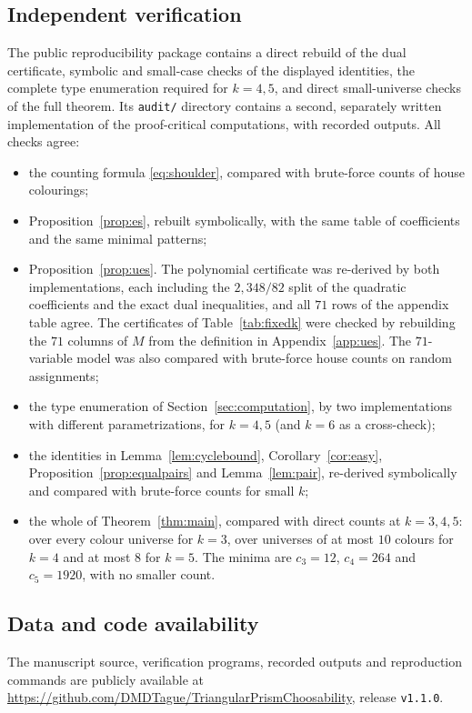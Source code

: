 \documentclass[11pt]{amsart}
\theoremstyle{definition}
\theoremstyle{remark}
\newcommand{\1}{\mathbf 1}
\begin{document}
\subsection{Independent verification}
The public reproducibility package contains a direct rebuild of the dual certificate, symbolic and
small-case checks of the displayed identities, the complete type enumeration required for $k=4,5$, and
direct small-universe checks of the full theorem. Its \texttt{audit/} directory contains a second,
separately written implementation of the proof-critical computations, with recorded outputs. All checks
agree:
\begin{itemize}
\item the counting formula \eqref{eq:shoulder}, compared with brute-force counts of house colourings;
\item Proposition~\ref{prop:es}, rebuilt symbolically, with the same table of coefficients and the same
  minimal patterns;
\item Proposition~\ref{prop:ues}. The polynomial certificate was re-derived by both implementations,
  each including the $2{,}348/82$ split of the quadratic coefficients and the exact dual inequalities,
  and all $71$ rows of the appendix table agree. The certificates of Table~\ref{tab:fixedk} were checked
  by rebuilding the $71$ columns of $M$ from the definition in Appendix~\ref{app:ues}. The
  $71$-variable model was also compared with brute-force house counts on random assignments;
\item the type enumeration of Section~\ref{sec:computation}, by two implementations with different
  parametrizations, for $k=4,5$ (and $k=6$ as a cross-check);
\item the identities in Lemma~\ref{lem:cyclebound}, Corollary~\ref{cor:easy},
  Proposition~\ref{prop:equalpairs} and Lemma~\ref{lem:pair}, re-derived symbolically and compared
  with brute-force counts for small $k$;
\item the whole of Theorem~\ref{thm:main}, compared with direct counts at $k=3,4,5$: over every
  colour universe for $k=3$, over universes of at most $10$ colours for $k=4$ and at most $8$ for
  $k=5$. The minima are $c_3=12$, $c_4=264$ and $c_5=1920$, with no smaller count.
\end{itemize}

\subsection*{Data and code availability}
The manuscript source, verification programs, recorded outputs and reproduction commands are publicly
available at \url{https://github.com/DMDTague/TriangularPrismChoosability}, release \texttt{v1.1.0}.
\end{document}
